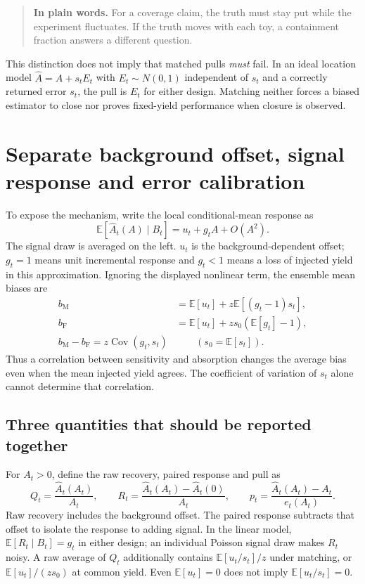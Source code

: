 \documentclass[11pt]{article}
\newcommand{\E}{\mathbb E}
\newcommand{\Cov}{\operatorname{Cov}}
\newcommand{\Ah}{\widehat A}
\newcommand{\plain}[1]{\begin{quote}\textbf{In plain words.} #1\end{quote}}
\begin{document}
\plain{For a coverage claim, the truth must stay put while the experiment
fluctuates. If the truth moves with each toy, a containment fraction answers
a different question.}

This distinction does not imply that matched pulls \emph{must} fail. In an
ideal location model $\Ah=A+s_t E_t$ with $E_t\sim N(0,1)$ independent of
$s_t$ and a correctly returned error $s_t$, the pull is $E_t$ for either
design. Matching neither forces a biased estimator to close nor proves
fixed-yield performance when closure is observed.

\clearpage
\section{Separate background offset, signal response and error calibration}
To expose the mechanism, write the local conditional-mean response as
\begin{equation}
 \E[\Ah_t(A)\mid B_t]=u_t+g_t A+O(A^2).
 \label{eq:linear}
\end{equation}
The signal draw is averaged on the left. $u_t$ is the background-dependent
offset; $g_t=1$ means unit incremental response and $g_t<1$ means a loss of
injected yield in this approximation. Ignoring the displayed nonlinear term,
the ensemble mean biases are
\begin{align}
 b_{\mathrm M}&=\E[u_t]+z\E[(g_t-1)s_t],\\
 b_{\mathrm F}&=\E[u_t]+z s_0(\E[g_t]-1),\\
 \boxed{b_{\mathrm M}-b_{\mathrm F}=z\Cov(g_t,s_t)}&\qquad (s_0=\E[s_t]).
 \label{eq:covbias}
\end{align}
Thus a correlation between sensitivity and absorption changes the average
bias even when the mean injected yield agrees. The coefficient of variation
of $s_t$ alone cannot determine that correlation.

\subsection*{Three quantities that should be reported together}
For $A_t>0$, define the raw recovery, paired response and pull as
\begin{equation}
 Q_t=\frac{\Ah_t(A_t)}{A_t},\qquad
 R_t=\frac{\Ah_t(A_t)-\Ah_t(0)}{A_t},\qquad
 p_t=\frac{\Ah_t(A_t)-A_t}{e_t(A_t)}.
 \label{eq:metrics}
\end{equation}
Raw recovery includes the background offset. The paired response subtracts
that offset to isolate the response to adding signal. In the linear model,
$\E[R_t\mid B_t]=g_t$ in either design; an individual Poisson signal draw
makes $R_t$ noisy. A raw average of $Q_t$ additionally contains
$\E[u_t/s_t]/z$ under matching, or $\E[u_t]/(zs_0)$ at common yield.
Even $\E[u_t]=0$ does not imply $\E[u_t/s_t]=0$.
\end{document}
